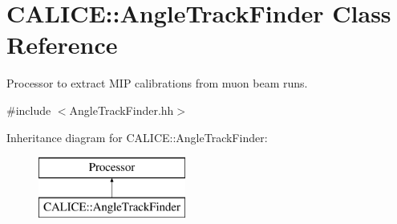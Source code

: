 \section{C\-A\-L\-I\-C\-E\-:\-:Angle\-Track\-Finder Class Reference}
\label{classCALICE_1_1AngleTrackFinder}


Processor to extract M\-I\-P calibrations from muon beam runs.  




{\ttfamily \#include $<$Angle\-Track\-Finder.\-hh$>$}

Inheritance diagram for C\-A\-L\-I\-C\-E\-:\-:Angle\-Track\-Finder\-:\begin{figure}[H]
\begin{center}
\leavevmode
\includegraphics[height=2.000000cm]{classCALICE_1_1AngleTrackFinder}
\end{center}
\end{figure}
